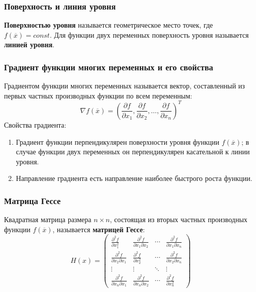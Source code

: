 \documentclass[a4paper,12pt]{report}
\begin{document}
\subsubsection{Поверхность и линия уровня}
\textbf{Поверхностью уровня} называется геометрическое место точек, где $f(\overline{x}) = const$. Для функции двух переменных поверхность уровня называется \textbf{линией уровня}.

\subsubsection{Градиент функции многих переменных и его свойства}
Градиентом функции многих переменных называется вектор, составленный из первых частных производных функции по всем переменным:
\begin{equation}
\label{eq:num16}
\nabla f(\overline{x}) = \left(\frac{\partial f}{\partial x_{1}}, \frac{\partial f}{\partial x_{2}}, \ldots, \frac{\partial f}{\partial x_{n}}\right)^{T}
\end{equation}
Свойства градиента:
\begin{enumerate}
\item Градиент функции перпендикулярен поверхности уровня функции $f(\overline{x})$; в случае функции двух переменных он перпендикулярен касательной к линии уровня.
\item Направление градиента есть направление наиболее быстрого роста функции.
\end{enumerate}

\subsubsection{Матрица Гессе}
Квадратная матрица размера $n \times n$, состоящая из вторых частных производных функции $f(\overline{x})$, называется \textbf{матрицей Гессе}:
\begin{equation}
\label{eq:num17}
H(x) = \begin{pmatrix}
\frac{\partial^{2} f}{\partial x^{2}_{1}} & \frac{\partial^{2} f}{\partial x_{1} \partial x_{2}} & \cdots & \frac{\partial^{2} f}{\partial x_{1} \partial x_{n}} \\
\frac{\partial^{2} f}{\partial x_{2} \partial x_{1}} & \frac{\partial^{2} f}{\partial x^{2}_{2}} & \cdots & \frac{\partial^{2} f}{\partial x_{2} \partial x_{n}} \\        
\vdots & \vdots & \ddots & \vdots \\
\frac{\partial^{2} f}{\partial x_{n} \partial x_{1}} & \frac{\partial^{2} f}{\partial x_{n} \partial x_{2}} & \cdots & \frac{\partial^{2} f}{\partial x^{2}_{n}}
\end{pmatrix}
\end{equation}
\end{document}
